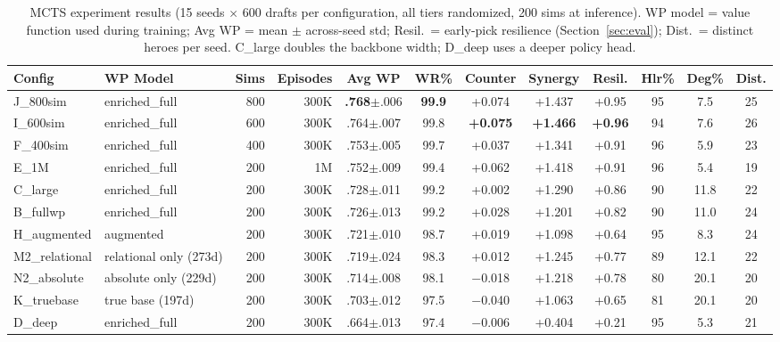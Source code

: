 \documentclass[journal]{IEEEtran}
\begin{document}
\begin{table}[t]
\centering
\caption{MCTS experiment results (15 seeds $\times$ 600 drafts per configuration, all tiers randomized, 200 sims at inference). WP model = value function used during training; Avg WP = mean $\pm$ across-seed std; Resil.\ = early-pick resilience (Section~\ref{sec:eval}); Dist.\ = distinct heroes per seed. C\_large doubles the backbone width; D\_deep uses a deeper policy head.}
\label{tab:mcts}
\begin{tabular}{llrrcccccccc}
\toprule
Config & WP Model & Sims & Episodes & Avg WP & WR\% & Counter & Synergy & Resil. & Hlr\% & Deg\% & Dist. \\
\midrule
J\_800sim & enriched\_full & 800 & 300K & \textbf{.768}{\scriptsize$\pm$.006} & \textbf{99.9} & +0.074 & +1.437 & +0.95 & 95 & 7.5 & 25 \\
I\_600sim & enriched\_full & 600 & 300K & .764{\scriptsize$\pm$.007} & 99.8 & \textbf{+0.075} & \textbf{+1.466} & \textbf{+0.96} & 94 & 7.6 & 26 \\
F\_400sim & enriched\_full & 400 & 300K & .753{\scriptsize$\pm$.005} & 99.7 & +0.037 & +1.341 & +0.91 & 96 & 5.9 & 23 \\
E\_1M & enriched\_full & 200 & 1M & .752{\scriptsize$\pm$.009} & 99.4 & +0.062 & +1.418 & +0.91 & 96 & 5.4 & 19 \\
C\_large & enriched\_full & 200 & 300K & .728{\scriptsize$\pm$.011} & 99.2 & +0.002 & +1.290 & +0.86 & 90 & 11.8 & 22 \\
B\_fullwp & enriched\_full & 200 & 300K & .726{\scriptsize$\pm$.013} & 99.2 & +0.028 & +1.201 & +0.82 & 90 & 11.0 & 24 \\
H\_augmented & augmented & 200 & 300K & .721{\scriptsize$\pm$.010} & 98.7 & +0.019 & +1.098 & +0.64 & 95 & 8.3 & 24 \\
M2\_relational & relational only (273d) & 200 & 300K & .719{\scriptsize$\pm$.024} & 98.3 & +0.012 & +1.245 & +0.77 & 89 & 12.1 & 22 \\
N2\_absolute & absolute only (229d) & 200 & 300K & .714{\scriptsize$\pm$.008} & 98.1 & $-$0.018 & +1.218 & +0.78 & 80 & 20.1 & 20 \\
K\_truebase & true base (197d) & 200 & 300K & .703{\scriptsize$\pm$.012} & 97.5 & $-$0.040 & +1.063 & +0.65 & 81 & 20.1 & 20 \\
D\_deep & enriched\_full & 200 & 300K & .664{\scriptsize$\pm$.013} & 97.4 & $-$0.006 & +0.404 & +0.21 & 95 & 5.3 & 21 \\
\bottomrule
\end{tabular}
\end{table}
\end{document}
